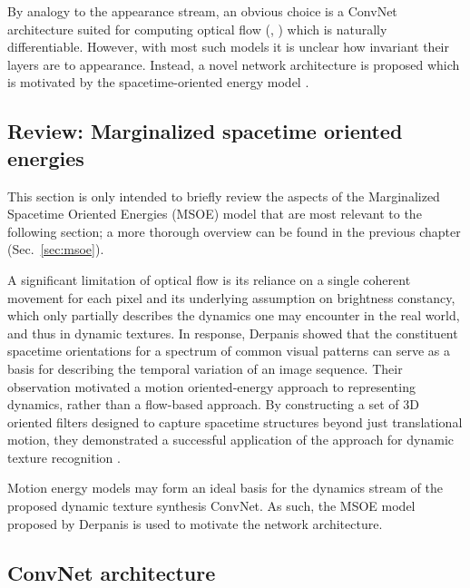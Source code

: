 By analogy to the appearance stream, an obvious choice
is a ConvNet architecture suited for computing
optical flow (\eg, \cite{dosovitskiy2015,ilg2017}) which
is naturally differentiable.
However, with most such models it is unclear how invariant
their layers are to appearance.
Instead, a novel network architecture is proposed which is
motivated by the spacetime-oriented energy model
\cite{derpanis2012spacetime,simoncelli1998}.

\subsection{Review: Marginalized spacetime oriented energies}

 This section is only intended to briefly review the aspects of the Marginalized Spacetime Oriented Energies (MSOE) model \cite{derpanis2012spacetime} that are most relevant to the following section; a more thorough overview can be found in the previous chapter (Sec.\ \ref{sec:msoe}).

A significant limitation of optical flow is its reliance on a single coherent movement for each pixel and its underlying assumption on brightness constancy, which only partially describes the dynamics one may encounter in the real world, and thus in dynamic textures. In response, Derpanis \etal \cite{derpanis2012spacetime} showed that the constituent
spacetime orientations for a spectrum of common
visual patterns can serve as a basis for describing the temporal
variation of an image sequence. Their observation motivated a motion oriented-energy approach to representing dynamics, rather than a flow-based approach. By constructing a set of 3D oriented filters designed to capture spacetime structures beyond just translational motion, they demonstrated a successful application of the approach for dynamic texture recognition \cite{derpanis2012spacetime}.

Motion energy models may form an ideal basis for the dynamics stream of the proposed dynamic texture synthesis ConvNet. As such, the MSOE model proposed by Derpanis \etal \cite{derpanis2012spacetime} is used to motivate the network architecture.

\subsection{ConvNet architecture}

